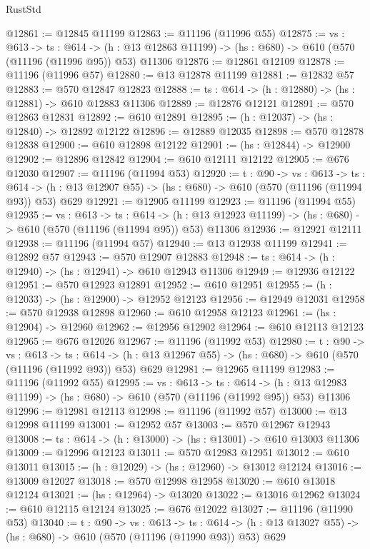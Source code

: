 \begin{lexlean}{RustStd}
\begin{coremodule}
@12861 := @12845 @11199
@12863 := @11196 (@11996 @55)
@12875 := {vs : @613} ->
  {ts : @614} ->
  (h : @13 @12863 @11199) -> (hs : @680) -> @610 (@570 (@11196 (@11996 @95)) @53) @11306
@12876 := @12861 @12109
@12878 := @11196 (@11996 @57)
@12880 := @13 @12878 @11199
@12881 := @12832 @57
@12883 := @570 @12847 @12823
@12888 := {ts : @614} -> (h : @12880) -> (hs : @12881) -> @610 @12883 @11306
@12889 := @12876 @12121
@12891 := @570 @12863 @12831
@12892 := @610 @12891
@12895 := (h : @12037) -> (hs : @12840) -> @12892 @12122
@12896 := @12889 @12035
@12898 := @570 @12878 @12838
@12900 := @610 @12898 @12122
@12901 := (hs : @12844) -> @12900
@12902 := @12896 @12842
@12904 := @610 @12111 @12122
@12905 := @676 @12030
@12907 := @11196 (@11994 @53)
@12920 := {t : @90} ->
  {vs : @613} ->
  {ts : @614} -> (h : @13 @12907 @55) -> (hs : @680) -> @610 (@570 (@11196 (@11994 @93)) @53) @629
@12921 := @12905 @11199
@12923 := @11196 (@11994 @55)
@12935 := {vs : @613} ->
  {ts : @614} ->
  (h : @13 @12923 @11199) -> (hs : @680) -> @610 (@570 (@11196 (@11994 @95)) @53) @11306
@12936 := @12921 @12111
@12938 := @11196 (@11994 @57)
@12940 := @13 @12938 @11199
@12941 := @12892 @57
@12943 := @570 @12907 @12883
@12948 := {ts : @614} -> (h : @12940) -> (hs : @12941) -> @610 @12943 @11306
@12949 := @12936 @12122
@12951 := @570 @12923 @12891
@12952 := @610 @12951
@12955 := (h : @12033) -> (hs : @12900) -> @12952 @12123
@12956 := @12949 @12031
@12958 := @570 @12938 @12898
@12960 := @610 @12958 @12123
@12961 := (hs : @12904) -> @12960
@12962 := @12956 @12902
@12964 := @610 @12113 @12123
@12965 := @676 @12026
@12967 := @11196 (@11992 @53)
@12980 := {t : @90} ->
  {vs : @613} ->
  {ts : @614} -> (h : @13 @12967 @55) -> (hs : @680) -> @610 (@570 (@11196 (@11992 @93)) @53) @629
@12981 := @12965 @11199
@12983 := @11196 (@11992 @55)
@12995 := {vs : @613} ->
  {ts : @614} ->
  (h : @13 @12983 @11199) -> (hs : @680) -> @610 (@570 (@11196 (@11992 @95)) @53) @11306
@12996 := @12981 @12113
@12998 := @11196 (@11992 @57)
@13000 := @13 @12998 @11199
@13001 := @12952 @57
@13003 := @570 @12967 @12943
@13008 := {ts : @614} -> (h : @13000) -> (hs : @13001) -> @610 @13003 @11306
@13009 := @12996 @12123
@13011 := @570 @12983 @12951
@13012 := @610 @13011
@13015 := (h : @12029) -> (hs : @12960) -> @13012 @12124
@13016 := @13009 @12027
@13018 := @570 @12998 @12958
@13020 := @610 @13018 @12124
@13021 := (hs : @12964) -> @13020
@13022 := @13016 @12962
@13024 := @610 @12115 @12124
@13025 := @676 @12022
@13027 := @11196 (@11990 @53)
@13040 := {t : @90} ->
  {vs : @613} ->
  {ts : @614} -> (h : @13 @13027 @55) -> (hs : @680) -> @610 (@570 (@11196 (@11990 @93)) @53) @629

\end{coremodule}
\end{lexlean}
